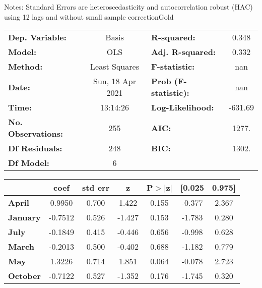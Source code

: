 Notes: \newline
 [1] Standard Errors are heteroscedasticity and autocorrelation robust (HAC) using 12 lags and without small sample correctionGold\begin{center}
\begin{tabular}{lclc}
\toprule
\textbf{Dep. Variable:}    &      Basis       & \textbf{  R-squared:         } &     0.348   \\
\textbf{Model:}            &       OLS        & \textbf{  Adj. R-squared:    } &     0.332   \\
\textbf{Method:}           &  Least Squares   & \textbf{  F-statistic:       } &       nan   \\
\textbf{Date:}             & Sun, 18 Apr 2021 & \textbf{  Prob (F-statistic):} &      nan    \\
\textbf{Time:}             &     13:14:26     & \textbf{  Log-Likelihood:    } &   -631.69   \\
\textbf{No. Observations:} &         255      & \textbf{  AIC:               } &     1277.   \\
\textbf{Df Residuals:}     &         248      & \textbf{  BIC:               } &     1302.   \\
\textbf{Df Model:}         &           6      & \textbf{                     } &             \\
\bottomrule
\end{tabular}
\begin{tabular}{lcccccc}
                 & \textbf{coef} & \textbf{std err} & \textbf{z} & \textbf{P$> |$z$|$} & \textbf{[0.025} & \textbf{0.975]}  \\
\midrule
\textbf{April}   &       0.9950  &        0.700     &     1.422  &         0.155        &       -0.377    &        2.367     \\
\textbf{January} &      -0.7512  &        0.526     &    -1.427  &         0.153        &       -1.783    &        0.280     \\
\textbf{July}    &      -0.1849  &        0.415     &    -0.446  &         0.656        &       -0.998    &        0.628     \\
\textbf{March}   &      -0.2013  &        0.500     &    -0.402  &         0.688        &       -1.182    &        0.779     \\
\textbf{May}     &       1.3226  &        0.714     &     1.851  &         0.064        &       -0.078    &        2.723     \\
\textbf{October} &      -0.7122  &        0.527     &    -1.352  &         0.176        &       -1.745    &        0.320     \\

\end{tabular}
\end{center}
